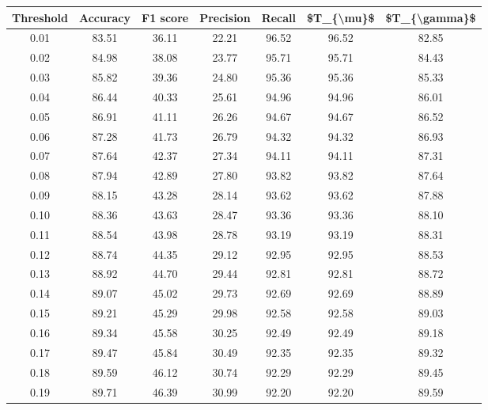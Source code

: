 \begin{tabular}{|c|c|c|c|c|c|c|}
\hline
 Threshold &  Accuracy &  F1 score &  Precision &  Recall &  \$T\_\{\textbackslash mu\}\$ &  \$T\_\{\textbackslash gamma\}\$ \\
\hline
      0.01 &     83.51 &     36.11 &      22.21 &   96.52 &      96.52 &         82.85 \\
      0.02 &     84.98 &     38.08 &      23.77 &   95.71 &      95.71 &         84.43 \\
      0.03 &     85.82 &     39.36 &      24.80 &   95.36 &      95.36 &         85.33 \\
      0.04 &     86.44 &     40.33 &      25.61 &   94.96 &      94.96 &         86.01 \\
      0.05 &     86.91 &     41.11 &      26.26 &   94.67 &      94.67 &         86.52 \\
      0.06 &     87.28 &     41.73 &      26.79 &   94.32 &      94.32 &         86.93 \\
      0.07 &     87.64 &     42.37 &      27.34 &   94.11 &      94.11 &         87.31 \\
      0.08 &     87.94 &     42.89 &      27.80 &   93.82 &      93.82 &         87.64 \\
      0.09 &     88.15 &     43.28 &      28.14 &   93.62 &      93.62 &         87.88 \\
      0.10 &     88.36 &     43.63 &      28.47 &   93.36 &      93.36 &         88.10 \\
      0.11 &     88.54 &     43.98 &      28.78 &   93.19 &      93.19 &         88.31 \\
      0.12 &     88.74 &     44.35 &      29.12 &   92.95 &      92.95 &         88.53 \\
      0.13 &     88.92 &     44.70 &      29.44 &   92.81 &      92.81 &         88.72 \\
      0.14 &     89.07 &     45.02 &      29.73 &   92.69 &      92.69 &         88.89 \\
      0.15 &     89.21 &     45.29 &      29.98 &   92.58 &      92.58 &         89.03 \\
      0.16 &     89.34 &     45.58 &      30.25 &   92.49 &      92.49 &         89.18 \\
      0.17 &     89.47 &     45.84 &      30.49 &   92.35 &      92.35 &         89.32 \\
      0.18 &     89.59 &     46.12 &      30.74 &   92.29 &      92.29 &         89.45 \\
      0.19 &     89.71 &     46.39 &      30.99 &   92.20 &      92.20 &         89.59 \\

\end{tabular}
